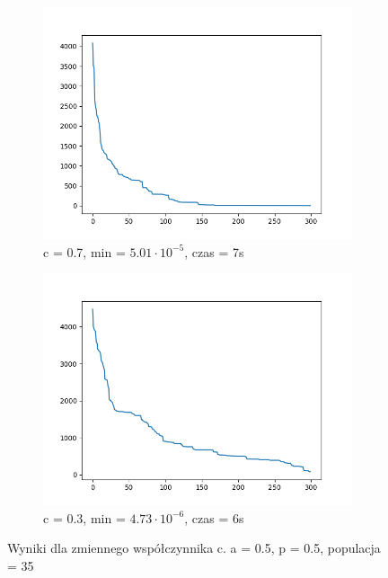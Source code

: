 \documentclass[12pt]{article}
\begin{document}
\begin{figure}[H]
    \centering
    \begin{subfigure}{0.49\textwidth}
        \centering
        \includegraphics[width=\linewidth]{plots/BOA/6_best.png}
        \caption{c = 0.7, min = $5.01\cdot 10^{-5}$, czas = 7s}
    \end{subfigure}
    \begin{subfigure}{0.49\textwidth}
        \centering
        \includegraphics[width=\linewidth]{plots/BOA/7_best.png}
        \caption{c = 0.3, min = $4.73\cdot 10^{-6}$, czas = 6s}
    \end{subfigure}
    \caption{Wyniki dla zmiennego współczynnika c. a = 0.5, p = 0.5, populacja = 35}
\end{figure}
\end{document}
